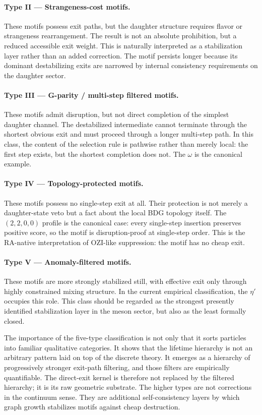 \documentclass[11pt]{article}
\begin{document}
\paragraph{Type II --- Strangeness-cost motifs.}
These motifs possess exit paths, but the daughter structure requires flavor or strangeness rearrangement. The result is not an absolute prohibition, but a reduced accessible exit weight. This is naturally interpreted as a stabilization layer rather than an added correction. The motif persists longer because its dominant destabilizing exits are narrowed by internal consistency requirements on the daughter sector.

\paragraph{Type III --- G-parity / multi-step filtered motifs.}
These motifs admit disruption, but not direct completion of the simplest daughter channel. The destabilized intermediate cannot terminate through the shortest obvious exit and must proceed through a longer multi-step path. In this class, the content of the selection rule is pathwise rather than merely local: the first step exists, but the shortest completion does not. The $\omega$ is the canonical example.

\paragraph{Type IV --- Topology-protected motifs.}
These motifs possess no single-step exit at all. Their protection is not merely a daughter-state veto but a fact about the local BDG topology itself. The $(2,2,0,0)$ profile is the canonical case: every single-step insertion preserves positive score, so the motif is disruption-proof at single-step order. This is the RA-native interpretation of OZI-like suppression: the motif has no cheap exit.

\paragraph{Type V --- Anomaly-filtered motifs.}
These motifs are more strongly stabilized still, with effective exit only through highly constrained mixing structure. In the current empirical classification, the $\eta'$ occupies this role. This class should be regarded as the strongest presently identified stabilization layer in the meson sector, but also as the least formally closed.

The importance of the five-type classification is not only that it sorts particles into familiar qualitative categories. It shows that the lifetime hierarchy is not an arbitrary pattern laid on top of the discrete theory. It emerges as a hierarchy of progressively stronger exit-path filtering, and those filters are empirically quantifiable. The direct-exit kernel is therefore not replaced by the filtered hierarchy; it is its raw geometric substrate. The higher types are not corrections in the continuum sense. They are additional self-consistency layers by which graph growth stabilizes motifs against cheap destruction.
\end{document}

